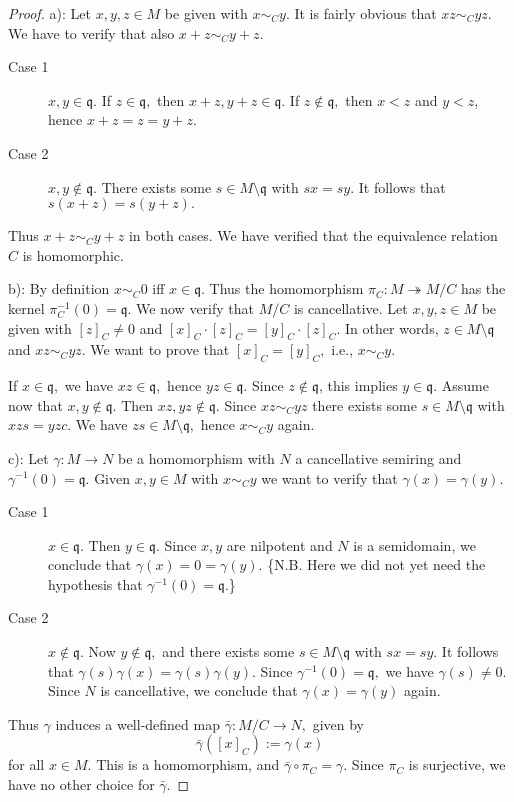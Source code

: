 \documentclass [12pt,a4paper,reqno]{amsart}
\begin{document}
\begin{proof} a): Let $x,y,z\in M$ be given with $x\sim_C y.$ It
is fairly obvious that $xz\sim_Cyz.$ We have to verify that also
$x+z\sim_Cy+z.$

\begin{description}
\item[Case 1] $x,y\in{\mathfrak q}.$ If $z\in{\mathfrak q},$ then $x+z,y+z\in{\mathfrak q}.$
If $z\notin {\mathfrak q},$ then $x<z$ and $y<z$, hence $x+z=z=y+z.$

\item[Case 2] $x,y\notin{\mathfrak q}.$ There exists some $s\in
M\setminus{\mathfrak q}$ with $sx=sy.$ It follows that $s(x+z)=s(y+z).$
\end{description}

Thus $x+z\sim_C y+z$ in both cases. We have verified that the
equivalence relation $C$ is homomorphic. {\vskip 1.5mm \noindent}

b): By definition $x\sim_C 0$ iff $x\in{\mathfrak q}.$ Thus the
homomorphism $\pi_C:M\twoheadrightarrow M/C$ has the kernel
$\pi_C^{-1}(0)={\mathfrak q}.$ We now verify that $M/C$ is cancellative.
Let $x,y,z\in M$ be given with $[z]_C\ne0$ and
$[x]_C\cdot[z]_C=[y]_C\cdot[z]_C.$ In other words, $z\in
M\setminus {\mathfrak q}$ and $xz\sim_C yz.$ We want to prove that
$[x]_C=[y]_C,$ i.e., $x\sim_Cy.$

If $x\in{\mathfrak q},$ we have $xz\in{\mathfrak q},$ hence $yz\in{\mathfrak q}.$ Since
$z\notin{\mathfrak q}$, this implies $y\in{\mathfrak q}.$ Assume now that $x,y\notin
{\mathfrak q}.$ Then $xz,yz\notin {\mathfrak q}.$ Since $xz\sim_Cyz$ there exists
some $s\in M\setminus {\mathfrak q}$ with $xzs=yzc.$ We have $zs\in
M\setminus{\mathfrak q},$ hence $x\sim_C y$ again. {\vskip 1.5mm \noindent}

c): Let ${\gamma} : M\to N$ be a homomorphism with $N$ a cancellative
semiring and ${\gamma} ^{-1}(0)={\mathfrak q}.$ Given $x,y\in M$ with $x\sim_C
y$ we want to verify that ${\gamma} (x)={\gamma} (y).$

\begin{description}
\item[Case 1] $x\in{\mathfrak q}.$ Then $y\in{\mathfrak q}.$ Since $x,y$ are nilpotent
and $N$ is a semidomain, we conclude that ${\gamma} (x)=0={\gamma} (y).$
\{N.B. Here we did not yet need the hypothesis that ${\gamma}
^{-1}(0)={\mathfrak q}.$\} {\vskip 1.5mm \noindent}

\item[Case 2] $x\notin{\mathfrak q}.$ Now $y\notin{\mathfrak q},$ and there exists
some $s\in M\setminus {\mathfrak q}$ with $sx=sy.$ It follows that ${\gamma}
(s){\gamma} (x)={\gamma} (s){\gamma} (y).$ Since ${\gamma} ^{-1}(0)={\mathfrak q},$ we have
${\gamma} (s)\neq 0.$ Since $N$ is cancellative, we conclude that ${\gamma}
(x)={\gamma} (y)$ again. \end{description}

Thus ${\gamma} $ induces a well-defined map $\bar{\gamma} : M/C\to N,$ given
by
$$\bar{\gamma} ([x]_C):={\gamma} (x)$$
for all $x\in M.$ This is a homomorphism, and $\bar{\gamma}
\circ\pi_C={\gamma} .$ Since $\pi_C$ is surjective, we have no other
choice for $\bar{\gamma} .$
\end{proof}
\end{document}
